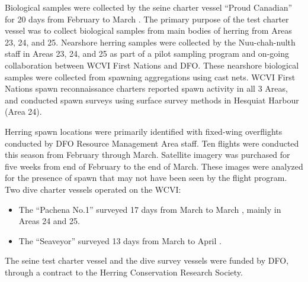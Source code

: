 Biological samples were collected by the seine charter vessel ``Proud Canadian'' for 20 days from February  to March .
The primary purpose of the test charter vessel was to collect biological samples from main bodies of herring from Areas 23, 24, and 25.
Nearshore herring samples were collected by the Nuu-chah-nulth staff in Areas 23, 24, and 25 as part of a pilot sampling program and on-going collaboration between WCVI First Nations and DFO.
These nearshore biological samples were collected from spawning aggregations using cast nets.
WCVI First Nations spawn reconnaissance charters reported spawn activity in all 3 Areas, and conducted spawn surveys using surface survey methods in Hesquiat Harbour (Area 24).

Herring spawn locations were primarily identiﬁed with ﬁxed-wing overﬂights conducted by DFO Resource Management Area staff.
Ten ﬂights were conducted this season from February through March.
Satellite imagery was purchased for five weeks from end of February to the end of March.
These images were analyzed for the presence of spawn that may not have been seen by the flight program. 
Two dive charter vessels operated on the WCVI:
\begin{itemize}
\item The ``Pachena No.1'' surveyed 17 days from March  to March , mainly in Areas 24 and 25.
\item The ``Seaveyor'' surveyed 13 days from March  to April .
\end{itemize}
The seine test charter vessel and the dive survey vessels were funded by DFO, through a contract to the Herring Conservation Research Society.